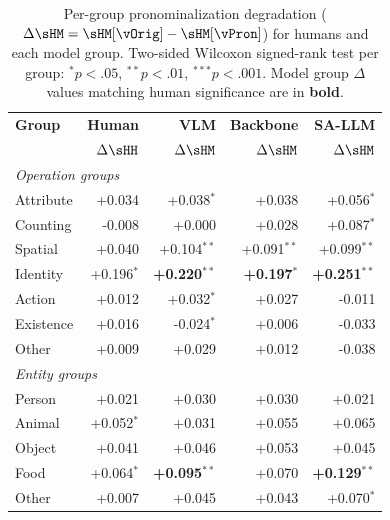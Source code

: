 \begin{table}[t]
\centering
\scriptsize
\setlength{\tabcolsep}{4pt}
\renewcommand{\arraystretch}{1.1}
\caption{Per-group pronominalization degradation ($\Delta\sHM = \sHM[\vOrig] - \sHM[\vPron]$) for humans and each model group. Two-sided Wilcoxon signed-rank test per group: $^{*}p{<}.05$, $^{**}p{<}.01$, $^{***}p{<}.001$. Model group $\Delta$ values matching human significance are in \textbf{bold}.}
\label{tab:degradation_wilcoxon}
\begin{tabular}{lrrrr}
\toprule
\textbf{Group} & \textbf{Human} & \textbf{VLM} & \textbf{Backbone} & \textbf{SA-LLM} \\
& $\Delta\sHH$ & $\Delta\sHM$ & $\Delta\sHM$ & $\Delta\sHM$ \\
\midrule
\multicolumn{5}{l}{\textit{Operation groups}} \\
\midrule
Attribute & +0.034 & +0.038$^{*}$ & +0.038 & +0.056$^{*}$ \\
Counting & -0.008 & +0.000 & +0.028 & +0.087$^{*}$ \\
Spatial & +0.040 & +0.104$^{**}$ & +0.091$^{**}$ & +0.099$^{**}$ \\
Identity & +0.196$^{*}$ & \textbf{+0.220$^{**}$} & \textbf{+0.197$^{*}$} & \textbf{+0.251$^{**}$} \\
Action & +0.012 & +0.032$^{*}$ & +0.027 & -0.011 \\
Existence & +0.016 & -0.024$^{*}$ & +0.006 & -0.033 \\
Other & +0.009 & +0.029 & +0.012 & -0.038 \\
\midrule
\multicolumn{5}{l}{\textit{Entity groups}} \\
\midrule
Person & +0.021 & +0.030 & +0.030 & +0.021 \\
Animal & +0.052$^{*}$ & +0.031 & +0.055 & +0.065 \\
Object & +0.041 & +0.046 & +0.053 & +0.045 \\
Food & +0.064$^{*}$ & \textbf{+0.095$^{**}$} & +0.070 & \textbf{+0.129$^{**}$} \\
Other & +0.007 & +0.045 & +0.043 & +0.070$^{*}$ \\
\bottomrule
\end{tabular}
\end{table}
